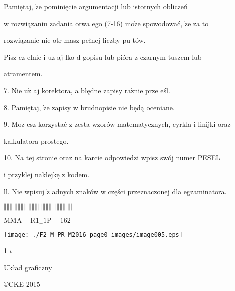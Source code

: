 \documentclass[a4paper,12pt]{article}
\begin{document}
Pamiętaj, $\dot{\mathrm{z}}\mathrm{e}$ pominięcie argumentacji lub istotnych obliczeń

w rozwiązaniu zadania otwa ego (7-16) $\mathrm{m}\mathrm{o}\dot{\mathrm{z}}\mathrm{e}$ spowodować, $\dot{\mathrm{z}}\mathrm{e}$ za to

rozwiązanie nie otr masz pełnej liczby pu tów.

Pisz cz elnie i $\mathrm{u}\dot{\mathrm{z}}$ aj lko $\mathrm{d}$ gopisu lub pióra z czarnym tuszem lub

atramentem.

7. Nie $\mathrm{u}\dot{\mathrm{z}}$ aj korektora, a błędne zapisy $\mathrm{r}\mathrm{a}\acute{\mathrm{z}}\mathrm{n}\mathrm{i}\mathrm{e}$ prze eśl.

8. Pamiętaj, $\dot{\mathrm{z}}\mathrm{e}$ zapisy w brudnopisie nie będą oceniane.

9. $\mathrm{M}\mathrm{o}\dot{\mathrm{z}}$ esz korzystać z zesta wzorów matematycznych, cyrkla i linijki oraz

kalkulatora prostego.

10. Na tej stronie oraz na karcie odpowiedzi wpisz swój numer PESEL

i przyklej naklejkę z kodem.

ll. Nie wpisuj $\dot{\mathrm{z}}$ adnych znaków w części przeznaczonej dla egzaminatora.

$\Vert\Vert\Vert\Vert\Vert\Vert\Vert\Vert\Vert\Vert\Vert\Vert\Vert\Vert\Vert\Vert\Vert\Vert\Vert\Vert\Vert\Vert\Vert\Vert|$

$\mathrm{M}\mathrm{M}\mathrm{A}-\mathrm{R}1_{-}1\mathrm{P}-162$
\begin{center}
\texttt{[image: ./F2\_M\_PR\_M2016\_page0\_images/image005.eps]}
\end{center}
1  $\iota$

Układ graficzny

\copyright CKE 2015
\end{document}
